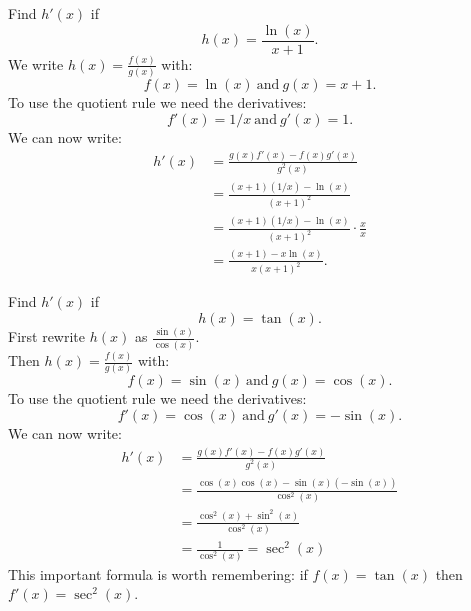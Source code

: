 \documentclass{ximera}
\begin{document}
\begin{center}
\begin{foldable}
\end{foldable}
\end{center}




\begin{example} %
Find $h'(x)$ if
\[
h(x) = \frac{\ln(x)}{x+1}.
\]
We write $\displaystyle{h(x) = \frac{f(x)}{g(x)}}$ 
with:
\[f(x) =\ln(x) \  \text{and} \  g(x)= x+1.\]
To use the quotient rule we need the derivatives:
\[f'(x) =1/x  \ \text{and} \  g'(x) = 1.\]
We can now write: 
\begin{align*}
h'(x) &= \frac{g(x)f'(x) - f(x)g'(x)}{g^2(x)}\\
&= \frac{(x+1)(1/x) - \ln(x)}{(x+1)^2}\\
&= \frac{(x+1)(1/x) - \ln(x)}{(x+1)^2}\cdot \frac{x}{x}\\
&= \frac{(x+1) - x\ln(x)}{x(x+1)^2}.
\end{align*}
\end{example}



\begin{center}
\begin{foldable}
\end{foldable}
\end{center}





\begin{example} %
Find $h'(x)$ if
\[
h(x) = \tan(x).
\]
First rewrite $h(x)$ as 
$\displaystyle{\frac{\sin(x)}{\cos(x)}}.$ \\
Then $\displaystyle{h(x) = \frac{f(x)}{g(x)}}$ with:
\[f(x) = \sin(x) \ \mbox{and} \  g(x)= \cos(x).\] 
To use the quotient rule we need the derivatives:
\[f'(x) = \cos(x) \ \mbox{and} \  g'(x) = -\sin(x).\]
We can now write: 
\begin{align*}
h'(x) &= \frac{g(x)f'(x) - f(x)g'(x)}{g^2(x)}\\
&= \frac{\cos(x)\cos(x) - \sin(x)(-\sin(x))}{\cos^2(x)}\\
&= \frac{\cos^2(x)+ \sin^2(x)}{\cos^2(x)}\\
&= \frac{1}{\cos^2(x)} = \sec^2(x)
\end{align*}
This important formula is worth remembering: if $f(x) = \tan(x)$ then $f'(x) =\sec^2(x)$.
\end{example}
\end{document}
